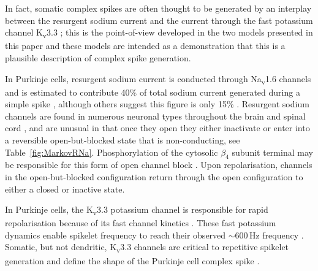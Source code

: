 \documentclass[twocolumn]{svjour3}          %
\newcommand{\hz}{\,\mathrm{Hz}}
\begin{document}
\begin{figure}
  \begin{center}
    
  \end{center}
  \end{figure}


In fact, somatic complex spikes are often thought to be generated by
an interplay between the resurgent sodium current
\citep{RamanBean1997,RamanBean2001,KhaliqEtAl2003,KhaliqRaman2006} and
the current through the fast potassium channel K\textsubscript{v}3.3
\citep{ZaghaEtAl2008,HurlockEtAl2008,VeysEtAl2013}; this is the
point-of-view developed in the two models presented in this paper and
these models are intended as a demonstration that this is a plausible
description of complex spike generation.

In Purkinje cells, resurgent sodium current is conducted through
Na\textsubscript{v}1.6 channels \citep{RamanBean1997} and is estimated
to contribute 40\% of total sodium current generated during a simple
spike \citep{RamanBean2001}, although others suggest this figure is
only 15\% \citep{LevinEtAl2006}. Resurgent sodium channels are found in
numerous neuronal types throughout the brain and spinal cord
\citep{OsorioEtAl2010}, and are unusual in that once they open they
either inactivate or enter into a reversible open-but-blocked state
that is non-conducting, see Table~\ref{fig:MarkovRNa}. Phosphorylation
of the cytosolic $\beta_4$ subunit terminal may be responsible for
this form of open channel block \citep{GriecoEtAl2002}. Upon
repolarisation, channels in the open-but-blocked configuration return
through the open configuration to either a closed or inactive state.

In Purkinje cells, the K\textsubscript{v}3.3 potassium channel is
responsible for rapid repolarisation \citep{VeysEtAl2013} because of
its fast channel kinetics
\citep{RudyEtAl1999,RudyMcBain2001}. These fast potassium dynamics
enable spikelet frequency to reach their observed $\sim 600\hz$
frequency \citep{WarnaarEtAl2015,BurroughsEtAl2016}. Somatic, but not
dendritic, K\textsubscript{v}3.3 channels are critical to repetitive
spikelet generation and define the shape of the Purkinje cell complex
spike \citep{HurlockEtAl2008,ZaghaEtAl2008,VeysEtAl2013}.
\end{document}
